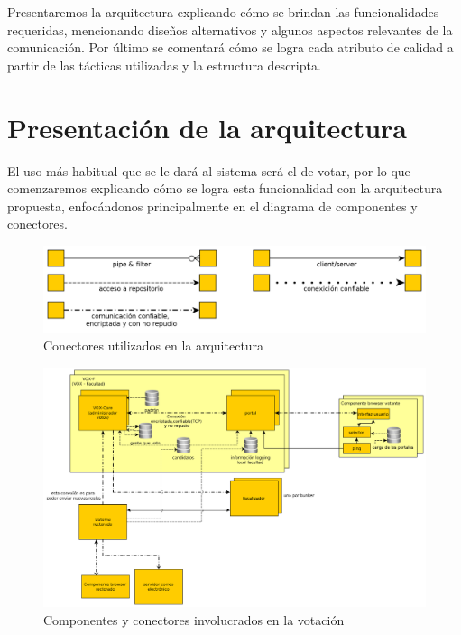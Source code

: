 

Presentaremos la arquitectura explicando cómo se brindan las funcionalidades requeridas, mencionando diseños alternativos y algunos aspectos relevantes de la comunicación. Por último se comentará cómo se logra cada atributo de calidad a partir de las tácticas utilizadas y la estructura descripta. 

\section{Presentación de la arquitectura}

El uso más habitual que se le dará al sistema será el de votar, por lo que comenzaremos explicando cómo se logra esta funcionalidad con la arquitectura propuesta, enfocándonos principalmente en el diagrama de componentes y conectores.

\begin{figure}[H]
	\begin{center}
		\includegraphics[scale=0.22]{../diagramas/tiposConector.png}
		\caption{Conectores utilizados en la arquitectura}
	\end{center} 
\end{figure}

\begin{figure}[H]
	\begin{center}
		\includegraphics[scale=0.22]{../diagramas/vistaPrincipal.png}
		\caption{Componentes y conectores involucrados en la votación}
	\end{center} 
\end{figure}

